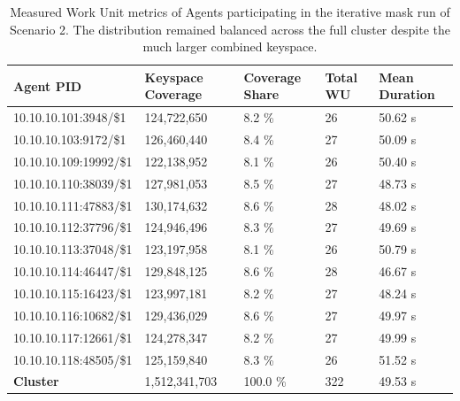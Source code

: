 \begin{table}[hbt]
    \centering
    \caption{Measured Work Unit metrics of Agents participating in the iterative mask run of Scenario 2. The distribution remained balanced across the full cluster despite the much larger combined keyspace.}
    \label{tab:scenario2_work_units}
    \footnotesize
    \begin{tabular}{|l|l|l|l|l|}
        \hline
         \textbf{Agent PID} & \textbf{Keyspace Coverage} & \textbf{Coverage Share} & \textbf{Total WU} & \textbf{Mean Duration} \\ \hline
         10.10.10.101:3948/\$1 & 124,722,650 & 8.2 \% & 26 & 50.62 s \\ \hline
         10.10.10.103:9172/\$1 & 126,460,440 & 8.4 \% & 27 & 50.09 s \\ \hline
         10.10.10.109:19992/\$1 & 122,138,952 & 8.1 \% & 26 & 50.40 s \\ \hline
         10.10.10.110:38039/\$1 & 127,981,053 & 8.5 \% & 27 & 48.73 s \\ \hline
         10.10.10.111:47883/\$1 & 130,174,632 & 8.6 \% & 28 & 48.02 s \\ \hline
         10.10.10.112:37796/\$1 & 124,946,496 & 8.3 \% & 27 & 49.69 s \\ \hline
         10.10.10.113:37048/\$1 & 123,197,958 & 8.1 \% & 26 & 50.79 s \\ \hline
         10.10.10.114:46447/\$1 & 129,848,125 & 8.6 \% & 28 & 46.67 s \\ \hline
         10.10.10.115:16423/\$1 & 123,997,181 & 8.2 \% & 27 & 48.24 s \\ \hline
         10.10.10.116:10682/\$1 & 129,436,029 & 8.6 \% & 27 & 49.97 s \\ \hline
         10.10.10.117:12661/\$1 & 124,278,347 & 8.2 \% & 27 & 49.99 s \\ \hline
         10.10.10.118:48505/\$1 & 125,159,840 & 8.3 \% & 26 & 51.52 s \\ \hline
         \textbf{Cluster} & 1,512,341,703 & 100.0 \% & 322 & 49.53 s \\ \hline
    \end{tabular}
\end{table}


